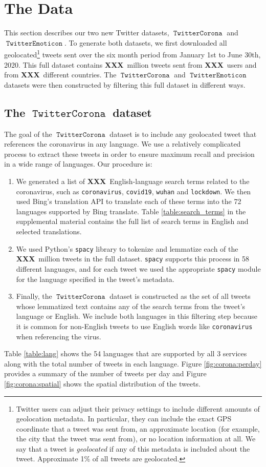 \documentclass[11pt]{article}
\newcommand{\defn}[1]{\emph{{#1}}}
\newcommand{\XXX}{\textbf{XXX}~}
\DeclareMathOperator{\emoticon}{\texttt{TwitterEmoticon}}
\DeclareMathOperator{\corona}{\texttt{TwitterCorona}}
\begin{document}
\section{The Data}
\label{sec:data}

This section describes our two new Twitter datasets, $\corona$ and $\emoticon$.
To generate both datasets,
we first downloaded all geolocated\footnote{%
Twitter users can adjust their privacy settings to include different amounts of geolocation metadata.
In particular, they can include the exact GPS coordinate that a tweet was sent from,
an approximate location (for example, the city that the tweet was sent from),
or no location information at all.
We say that a tweet is \defn{geolocated} if any of this metadata is included about the tweet.
Approximate 1\% of all tweets are geolocated.
} 
tweets sent over the six month period from January 1st to June 30th, 2020.
This full dataset contains \XXX million tweets sent from \XXX users and from \XXX different countries.
The $\corona$ and $\emoticon$ datasets were then constructed by filtering this full dataset in different ways.

\subsection {The $\corona$ dataset}

The goal of the $\corona$ dataset is to include any geolocated tweet that references the coronavirus in any language.
We use a relatively complicated process to extract these tweets in order to ensure maximum recall and precision in a wide range of languages.
Our procedure is:
\begin{enumerate}
\item
We generated a list of \XXX English-language search terms related to the coronavirus,
such as \texttt{coronavirus}, \texttt{covid19}, \texttt{wuhan} and \texttt{lockdown}.
We then used Bing's translation API to translate each of these terms into the 72 languages supported by Bing translate.
Table \ref{table:search_terms} in the supplemental material contains the full list of search terms in English and selected translations.
\item
We used Python's \texttt{spacy} library \citep{fixme} to tokenize and lemmatize each of the \XXX million tweets in the full dataset.
\texttt{spacy} supports this process in 58 different languages,
and for each tweet we used the appropriate \texttt{spacy} module for the language specified in the tweet's metadata.
\item
Finally, the $\corona$ dataset is constructed as the set of all tweets whose lemmatized text contains any of the search terms from the tweet's language or English.
We include both languages in this filtering step because it is common for non-English tweets to use English words like \texttt{coronavirus} when referencing the virus.
\end{enumerate}
Table \ref{table:lang} shows the 54 languages that are supported by all 3 services along with the total number of tweets in each language.
Figure \ref{fig:corona:perday} provides a summary of the number of tweets per day and Figure \ref{fig:corona:spatial} shows the spatial distribution of the tweets.
\end{document}
